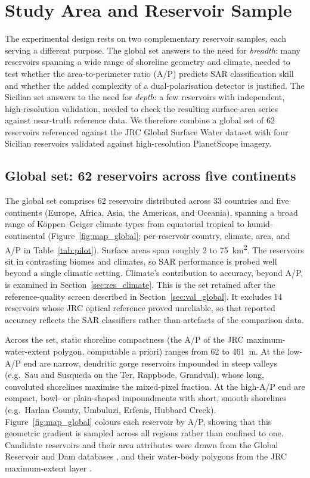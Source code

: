 \section{Study Area and Reservoir Sample}
\label{sec:study_area}

The experimental design rests on two complementary reservoir samples, each
serving a different purpose. The global set answers to the need for
\emph{breadth}: many reservoirs spanning a wide range of shoreline geometry
and climate, needed to test whether the area-to-perimeter ratio (A/P)
predicts SAR classification skill and whether the added complexity of a
dual-polarisation detector is justified. The Sicilian set answers to the need
for \emph{depth}: a few reservoirs with independent, high-resolution
validation, needed to check the resulting surface-area series against
near-truth reference data. We therefore combine a global set of
62 reservoirs referenced against the JRC Global Surface Water dataset
\citep{Pekel2016} with four Sicilian reservoirs validated against
high-resolution PlanetScope imagery.

\subsection{Global set: 62 reservoirs across five continents}
\label{sec:study_global}

The global set comprises 62 reservoirs distributed across 33 countries and
five continents (Europe, Africa, Asia, the Americas, and Oceania), spanning
a broad range of K\"oppen--Geiger climate types from equatorial tropical to
humid-continental (Figure~\ref{fig:map_global}; per-reservoir country,
climate, area, and A/P in Table~\ref{tab:pilot}). Surface areas span roughly
2 to 75~\si{\kilo\metre\squared}. The reservoirs sit in contrasting biomes and
climates, so SAR performance is probed well beyond a single climatic setting.
Climate's contribution to accuracy, beyond A/P, is examined in
Section~\ref{sec:res_climate}. This is the set retained after the
reference-quality screen described in Section~\ref{sec:val_global}. It excludes
14 reservoirs whose JRC optical reference proved unreliable, so that reported
accuracy reflects the SAR classifiers rather than artefacts of the comparison
data.

Across the set, static shoreline compactness (the A/P of the JRC
maximum-water-extent polygon, computable a priori)
ranges from 62 to 461~m. At the low-A/P end are narrow, dendritic gorge
reservoirs impounded in steep valleys (e.g.\ Sau and Susqueda on the Ter,
Rappbode, Grandval), whose long, convoluted shorelines maximise the
mixed-pixel fraction. At the high-A/P end are compact, bowl- or plain-shaped
impoundments with short, smooth shorelines (e.g.\ Harlan County, Umbuluzi,
Erfenis, Hubbard Creek). Figure~\ref{fig:map_global} colours each reservoir
by A/P, showing that this geometric gradient is sampled across all regions
rather than confined to one. Candidate reservoirs and their area attributes
were drawn from the Global Reservoir and Dam databases
\citep[GRanD, GRDL;][]{Lehner2011, Hao2024}, and their water-body polygons
from the JRC maximum-extent layer \citep{Pekel2016}.

